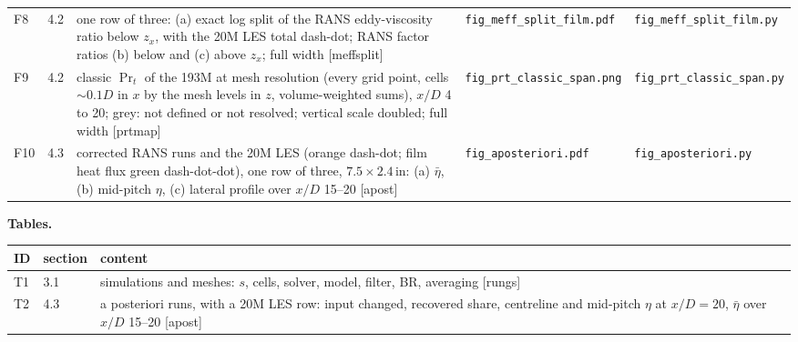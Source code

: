 \documentclass[10pt]{article}
\newcommand{\etab}{\bar\eta}
\begin{document}
{\begin{tabularx}{\textwidth}{@{}l l X l l@{}}
F8 & 4.2 & one row of three: (a) exact log split of the RANS eddy-viscosity ratio below $z_x$, with the 20M LES total dash-dot; RANS factor ratios (b) below and (c) above $z_x$; full width [meffsplit] & \texttt{fig\_meff\_split\_film.pdf} & \texttt{fig\_meff\_split\_film.py} \\
F9 & 4.2 & classic $\Pr_t$ of the 193M at mesh resolution (every grid point, cells $\sim0.1D$ in $x$ by the mesh levels in $z$, volume-weighted sums), $x/D$ 4 to 20; grey: not defined or not resolved; vertical scale doubled; full width [prtmap] & \texttt{fig\_prt\_classic\_span.png} & \texttt{fig\_prt\_classic\_span.py} \\
F10 & 4.3 & corrected RANS runs and the 20M LES (orange dash-dot; film heat flux green dash-dot-dot), one row of three, $7.5\times2.4$\,in: (a) $\etab$, (b) mid-pitch $\eta$, (c) lateral profile over $x/D$ 15--20 [apost] & \texttt{fig\_aposteriori.pdf} & \texttt{fig\_aposteriori.py} \\
\bottomrule
\end{tabularx}\par}

\textbf{Tables.}\par
{\centering\footnotesize
\begin{tabularx}{\textwidth}{@{}l l X@{}}
\toprule
ID & section & content \\
\midrule
T1 & 3.1 & simulations and meshes: $s$, cells, solver, model, filter, BR, averaging [rungs] \\
T2 & 4.3 & a posteriori runs, with a 20M LES row: input changed, recovered share, centreline and mid-pitch $\eta$ at $x/D=20$, $\etab$ over $x/D$ 15--20 [apost] \\
\bottomrule
\end{tabularx}\par}
\end{document}
